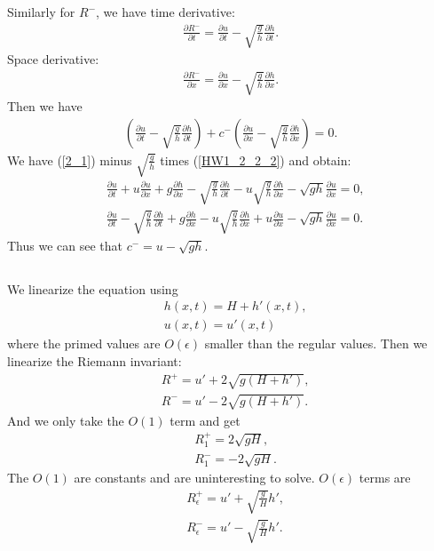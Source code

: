 \documentclass[11pt,letterpaper]{book}
\theoremstyle{definition}
\newcommand{\pe}{\partial}
\newcommand{\dsp}{\displaystyle}
\begin{document}
Similarly for $R^-$, we have time derivative:
\begin{align*}
\frac{\pe R^-}{\pe t} = \frac{\pe u}{\pe t}-\sqrt{\frac{g}{h}}\frac{\pe h}{\pe t}.
\end{align*}
Space derivative:
\begin{align*}
\frac{\pe R^-}{\pe x} = \frac{\pe u}{\pe x}-\sqrt{\frac{g}{h}}\frac{\pe h}{\pe x}.
\end{align*}
Then we have
\begin{align*}
\left( \frac{\pe u}{\pe t}-\sqrt{\frac{g}{h}}\frac{\pe h}{\pe t} \right)+c^-\left( \frac{\pe u}{\pe x}-\sqrt{\frac{g}{h}}\frac{\pe h}{\pe x} \right) = 0.
\end{align*}
We have (\ref{2_1}) minus $\dsp{\sqrt{\frac{g}{h}}}$ times (\ref{HW1_2_2_2}) and obtain:
\begin{align*}
&\frac{\pe u}{\pe t}+u\frac{\pe u}{\pe x} + g\frac{\pe h}{\pe x}-\sqrt{\frac{g}{h}}\frac{\pe h}{\pe t}-u\sqrt{\frac{g}{h}}\frac{\pe h}{\pe x}-\sqrt{gh}\frac{\pe u}{\pe x} = 0,\\
&\frac{\pe u}{\pe t}-\sqrt{\frac{g}{h}}\frac{\pe h}{\pe t}+ g\frac{\pe h}{\pe x}-u\sqrt{\frac{g}{h}}\frac{\pe h}{\pe x}+u\frac{\pe u}{\pe x} -\sqrt{gh}\frac{\pe u}{\pe x} = 0.
\end{align*}
Thus we can see that $c^- = u-\sqrt{gh}$. 

\subsection{}
We linearize the equation using
\begin{align*}
&h(x,t) = H+h'(x,t),\\
&u(x,t) = u'(x,t)
\end{align*}
where the primed values are $O(\epsilon)$ smaller than the regular values. Then we linearize the Riemann invariant:
\begin{align*}
&R^+ = u'+2\sqrt{g(H+h')},\\
&R^- = u'-2\sqrt{g(H+h')}.
\end{align*}
And we only take the $O(1)$ term and get
\begin{align*}
&R^+_1 = 2\sqrt{gH},\\
&R^-_1 = -2\sqrt{gH}.
\end{align*}
The $O(1)$ are constants and are uninteresting to solve. $O(\epsilon)$ terms are
\begin{align*}
&R^+_\epsilon = u'+\sqrt{\frac{g}{H}}h',\\
&R^-_\epsilon = u'-\sqrt{\frac{g}{H}}h'.
\end{align*}
\end{document}
